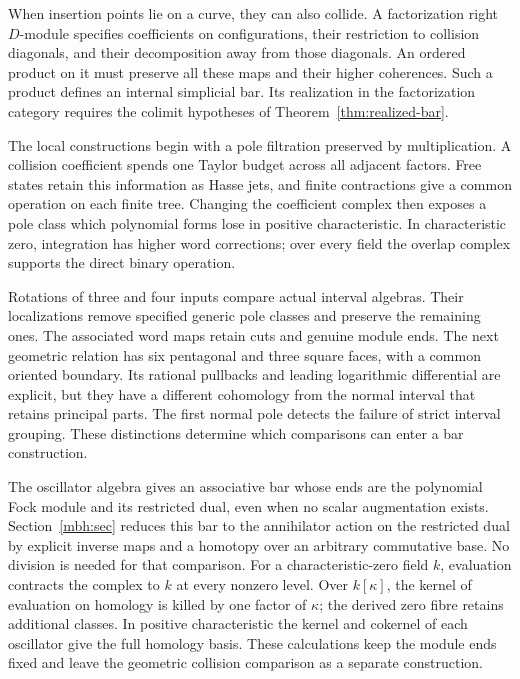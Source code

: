 \documentclass[11pt,reqno]{amsart}
\theoremstyle{definition}
\theoremstyle{remark}
\begin{document}
When insertion points lie on a curve, they can also collide.  A
factorization right \(D\)-module specifies coefficients on configurations,
their restriction to collision diagonals, and their decomposition away
from those diagonals.  An ordered product on it must preserve all these
maps and their higher coherences.  Such a product defines an internal
simplicial bar.  Its realization in the factorization category requires
the colimit hypotheses of Theorem~\ref{thm:realized-bar}.

The local constructions begin with a pole filtration preserved by
multiplication.  A collision coefficient spends one Taylor budget
across all adjacent factors.  Free states retain this information as
Hasse jets, and finite contractions give a common operation on each
finite tree.  Changing the coefficient complex then exposes a pole
class which polynomial forms lose in positive characteristic.  In
characteristic zero, integration has higher word corrections; over
every field the overlap complex supports the direct binary operation.

Rotations of three and four inputs compare actual interval algebras.
Their localizations remove specified generic pole classes and preserve
the remaining ones.  The associated word maps retain cuts and genuine
module ends.  The next geometric relation has six pentagonal and three
square faces, with a common oriented boundary.  Its rational pullbacks
and leading logarithmic differential are explicit, but they have a
different cohomology from the normal interval that retains principal
parts.  The first normal pole detects the failure of strict interval
grouping.  These distinctions determine which comparisons can enter a
bar construction.

The oscillator algebra gives an associative bar whose ends are the
polynomial Fock module and its restricted dual, even when no scalar
augmentation exists.
Section~\ref{mbh:sec} reduces this bar to the annihilator action on
the restricted dual by explicit inverse maps and a homotopy over an
arbitrary commutative base.  No division is needed for that comparison.
For a characteristic-zero field \(k\), evaluation contracts the
complex to \(k\) at every nonzero level.  Over \(k[\kappa]\),
the kernel of evaluation on homology is killed by one factor of
\(\kappa\); the derived zero fibre retains additional classes.
In positive characteristic the kernel and
cokernel of each oscillator give the full homology basis.
These calculations keep the module ends fixed and leave the
geometric collision comparison as a separate construction.
\end{document}
